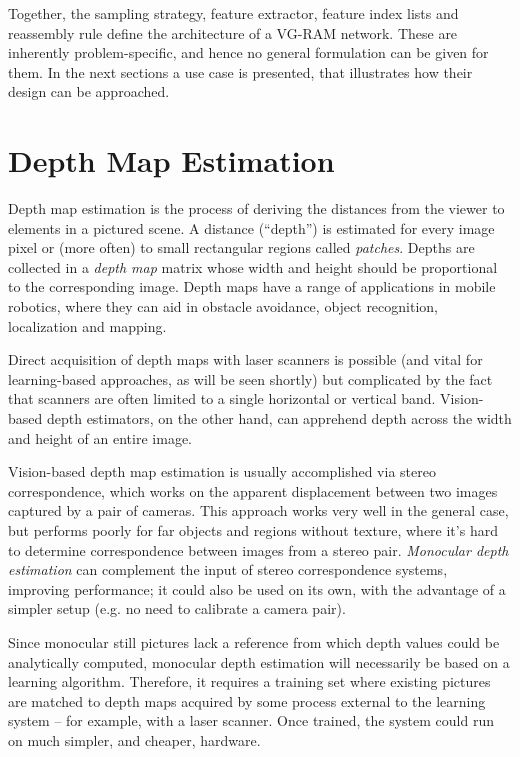 \documentclass[twocolumn, 9pt]{jsproceedings}
\begin{document}
Together, the sampling strategy, feature extractor, feature index lists and reassembly rule define the architecture of a VG-RAM network. These are inherently problem-specific, and hence no general formulation can be given for them. In the next sections a use case is presented, that illustrates how their design can be approached.

\section{Depth Map Estimation}

Depth map estimation is the process of deriving the distances from the viewer to elements in a pictured scene. A distance (``depth'') is estimated for every image pixel or (more often) to small rectangular regions called {\it patches}. Depths are collected in a {\it depth map} matrix whose width and height should be proportional to the corresponding image. Depth maps have a range of applications in mobile robotics, where they can aid in obstacle avoidance, object recognition, localization and mapping.

Direct acquisition of depth maps with laser scanners is possible (and vital for learning-based approaches, as will be seen shortly) but complicated by the fact that scanners are often limited to a single horizontal or vertical band. Vision-based depth estimators, on the other hand, can apprehend depth across the width and height of an entire image.

Vision-based depth map estimation is usually accomplished via stereo correspondence, which works on the apparent displacement between two images captured by a pair of cameras. This approach works very well in the general case, but performs poorly for far objects and regions without texture, where it's hard to determine correspondence between images from a stereo pair. {\it Monocular depth estimation} can complement the input of stereo correspondence systems, improving performance; it could also be used on its own, with the advantage of a simpler setup (e.g. no need to calibrate a camera pair).

Since monocular still pictures lack a reference from which depth values could be analytically computed, monocular depth estimation will necessarily be based on a learning algorithm. Therefore, it requires a training set where existing pictures are matched to depth maps acquired by some process external to the learning system -- for example, with a laser scanner. Once trained, the system could run on much simpler, and cheaper, hardware.
\end{document}

